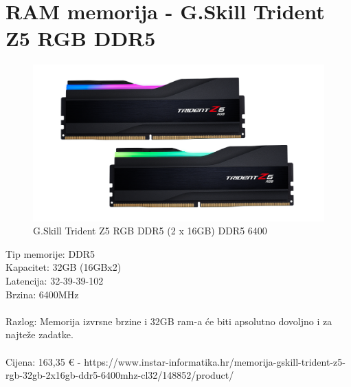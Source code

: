 \documentclass{report}
\begin{document}
\section{RAM memorija - G.Skill Trident Z5 RGB DDR5}
\begin{figure}[H]
    \centering
    \includegraphics[scale=0.17]{Slike/gskillram.png}
    \caption{G.Skill Trident Z5 RGB DDR5 (2 x 16GB) DDR5 6400}
    \label{fig:ram}
\end{figure}
Tip memorije: DDR5\\Kapacitet: 32GB (16GBx2)\\Latencija: 32-39-39-102\\Brzina: 6400MHz\\\\Razlog: Memorija izvrsne brzine i 32GB ram-a će biti apsolutno dovoljno i za najteže zadatke.\\\\Cijena: 163,35 € - https://www.instar-informatika.hr/memorija-gskill-trident-z5-rgb-32gb-2x16gb-ddr5-6400mhz-cl32/148852/product/

\pagebreak
\end{document}
